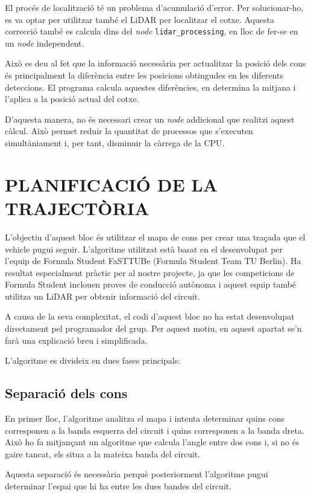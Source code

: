 \documentclass[11pt,a4paper]{article}
\let\origsection\section
\renewcommand{\section}{\clearpage\origsection}
\begin{document}
El procés de localització té un problema d’acumulació d’error. Per solucionar-ho, es va optar per utilitzar també el LiDAR per localitzar el cotxe. Aquesta correcció també es calcula dins del \emph{node} \texttt{lidar\_\allowbreak{}processing}, en lloc de fer-se en un \emph{node} independent.

Això es deu al fet que la informació necessària per actualitzar la posició dels cons és principalment la diferència entre les posicions obtingudes en les diferents deteccions. El programa calcula aquestes diferències, en determina la mitjana i l’aplica a la posició actual del cotxe.

D’aquesta manera, no és necessari crear un \emph{node} addicional que realitzi aquest càlcul. Això permet reduir la quantitat de processos que s’executen simultàniament i, per tant, disminuir la càrrega de la CPU.

\section{PLANIFICACIÓ DE LA TRAJECTÒRIA}

L’objectiu d’aquest bloc és utilitzar el mapa de cons per crear una traçada que el vehicle pugui seguir. L’algoritme utilitzat està basat en el desenvolupat per l’equip de Formula Student FaSTTUBe (Formula Student Team TU Berlin). Ha resultat especialment pràctic per al nostre projecte, ja que les competicions de Formula Student inclouen proves de conducció autònoma i aquest equip també utilitza un LiDAR per obtenir informació del circuit.

A causa de la seva complexitat, el codi d’aquest bloc no ha estat desenvolupat directament pel programador del grup. Per aquest motiu, en aquest apartat se’n farà una explicació breu i simplificada.

L’algoritme es divideix en dues fases principals:
\nopagebreak

\subsection{Separació dels cons}

En primer lloc, l’algoritme analitza el mapa i intenta determinar quins cons corresponen a la banda esquerra del circuit i quins corresponen a la banda dreta. Això ho fa mitjançant un algoritme que calcula l’angle entre dos cons i, si no és gaire tancat, els situa a la mateixa banda del circuit.

Aquesta separació és necessària perquè posteriorment l’algoritme pugui determinar l’espai que hi ha entre les dues bandes del circuit.
\end{document}
